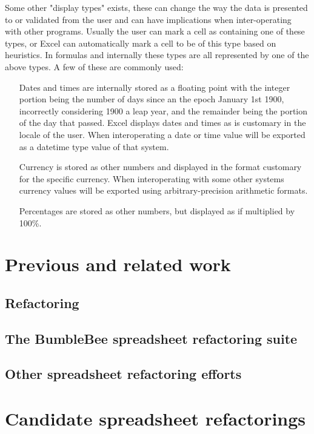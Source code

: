 \documentclass[12pt,a4paper,onecolumn,oneside]{memoir}
\begin{document}
Some other "display types" exists, these can change the way the data is presented to or validated from the user and can have implications when inter-operating with other programs.
Usually the user can mark a cell as containing one of these types, or Excel can automatically mark a cell to be of this type based on heuristics.
In formulas and internally these types are all represented by one of the above types.
A few of these are commonly used:
\begin{itemize}
\item[Dates and times] are internally stored as a floating point with the integer portion being the number of days since an the epoch January 1st 1900, incorrectly considering 1900 a leap year, and the remainder being the portion of the day that passed.
Excel displays dates and times as is customary in the locale of the user.
When interoperating a date or time value will be exported as a datetime type value of that system.
\item[Currency] is stored as other numbers and displayed in the format customary for the specific currency. When interoperating with some other systems currency values will be exported using arbitrary-precision arithmetic formats.
\item[Percentages] are stored as other numbers, but displayed as if multiplied by 100\%.
\end{itemize}

\chapter{Previous and related work}

\section{Refactoring}

\section{The BumbleBee spreadsheet refactoring suite}

\section{Other spreadsheet refactoring efforts}


\chapter{Candidate spreadsheet refactorings}
\end{document}
